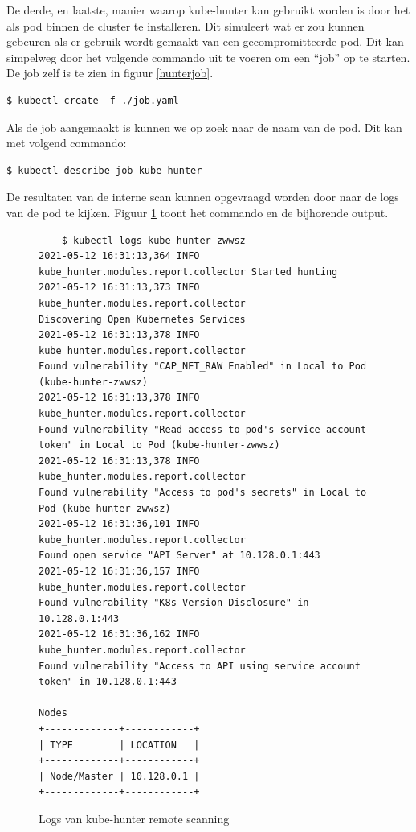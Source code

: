 De derde, en laatste, manier waarop kube-hunter kan gebruikt worden is door het als pod binnen de cluster te installeren. Dit simuleert wat er zou kunnen gebeuren als er gebruik wordt gemaakt van een gecompromitteerde pod. Dit kan simpelweg door het volgende commando uit te voeren om een ``job'' op te starten. De job zelf is te zien in figuur \ref{hunterjob}.

\begin{verbatim} 
$ kubectl create -f ./job.yaml
\end{verbatim}

Als de job aangemaakt is kunnen we op zoek naar de naam van de pod. Dit kan met volgend commando:
\begin{verbatim} 
$ kubectl describe job kube-hunter
\end{verbatim}

De resultaten van de interne scan kunnen opgevraagd worden door naar de logs van de pod te kijken. Figuur \ref{hunterOut} toont het commando en de bijhorende output.
\begin{figure}[h] 
	\centering
	\begin{verbatim} 
	$ kubectl logs kube-hunter-zwwsz
2021-05-12 16:31:13,364 INFO kube_hunter.modules.report.collector Started hunting
2021-05-12 16:31:13,373 INFO kube_hunter.modules.report.collector 
Discovering Open Kubernetes Services
2021-05-12 16:31:13,378 INFO kube_hunter.modules.report.collector 
Found vulnerability "CAP_NET_RAW Enabled" in Local to Pod (kube-hunter-zwwsz)
2021-05-12 16:31:13,378 INFO kube_hunter.modules.report.collector 
Found vulnerability "Read access to pod's service account token" in Local to Pod (kube-hunter-zwwsz)
2021-05-12 16:31:13,378 INFO kube_hunter.modules.report.collector 
Found vulnerability "Access to pod's secrets" in Local to Pod (kube-hunter-zwwsz)
2021-05-12 16:31:36,101 INFO kube_hunter.modules.report.collector 
Found open service "API Server" at 10.128.0.1:443
2021-05-12 16:31:36,157 INFO kube_hunter.modules.report.collector 
Found vulnerability "K8s Version Disclosure" in 10.128.0.1:443
2021-05-12 16:31:36,162 INFO kube_hunter.modules.report.collector 
Found vulnerability "Access to API using service account token" in 10.128.0.1:443

Nodes
+-------------+------------+
| TYPE        | LOCATION   |
+-------------+------------+
| Node/Master | 10.128.0.1 |
+-------------+------------+
	\end{verbatim}
	\caption{Logs van kube-hunter remote scanning}
	\label{hunterOut}
\end{figure}

